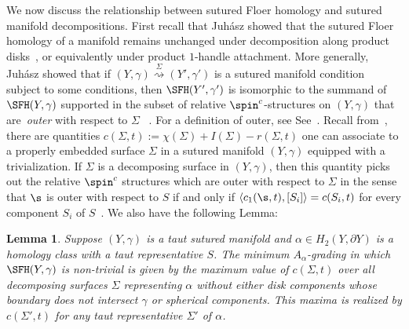 \documentclass{amsart}
\newtheorem{lemma}[theorem]{Lemma}
\theoremstyle{definition}
\theoremstyle{remark}
\numberwithin{equation}{section}
\begin{document}
We now discuss the relationship between sutured Floer homology and sutured manifold decompositions. First recall that Juh\'asz showed that the sutured Floer homology of a manifold remains unchanged under decomposition along product disks~\cite[Lemma 9.113]{juhasz2006holomorphic}, or equivalently under product $1$-handle attachment. More generally, Juh\'asz showed that if $(Y,\gamma)\overset{\Sigma}{\rightsquigarrow} (Y',\gamma')$ is a sutured manifold condition subject to some conditions, then $\SFH(Y',\gamma')$ is isomorphic to the summand of $\SFH(Y,\gamma)$ supported in the subset of relative $\spin^c$-structures on $(Y,\gamma)$ that are~\emph{outer} with respect to $\Sigma$ ~\cite[Theorem 1.3]{juhasz2008floer}. For a definition of outer, see See~\cite[Definition 1.1]{juhasz2010sutured}. Recall from~\cite[Definition 3.8]{juhasz2008floer}, there are quantities $c(\Sigma,t):=\chi(\Sigma)+I(\Sigma)-r(\Sigma,t)$ one can associate to a properly embedded surface $\Sigma$ in a sutured manifold $(Y,\gamma)$ equipped with a trivialization. If $\Sigma$ is a decomposing surface in $(Y,\gamma)$, then this quantity picks out the relative $\spin^c$ structures which are outer with respect to $\Sigma$ in the sense that $\s$ is outer with respect to $S$ if and only if $\langle c_1(\s,t),[S_i]\rangle=c(S_i,t)$ for every component $S_i$ of $S$~\cite[Lemma 3.10]{juhasz2010sutured}. We also have the following Lemma:
\begin{lemma}\label{lem:maxagrading}
    Suppose $(Y,\gamma)$ is a taut sutured manifold and $\alpha\in H_2(Y,\partial Y)$ is a homology class with a taut representative $S$. The minimum $A_\alpha$-grading in which $\SFH(Y,\gamma)$ is non-trivial is given by the maximum value of $c(\Sigma,t)$ over all decomposing surfaces $\Sigma$ representing $\alpha$ without either disk components whose boundary does not intersect $\gamma$ or spherical components. This maxima is realized by $c(\Sigma',t)$ for any taut representative $\Sigma'$ of $\alpha$.
\end{lemma}
\end{document}
